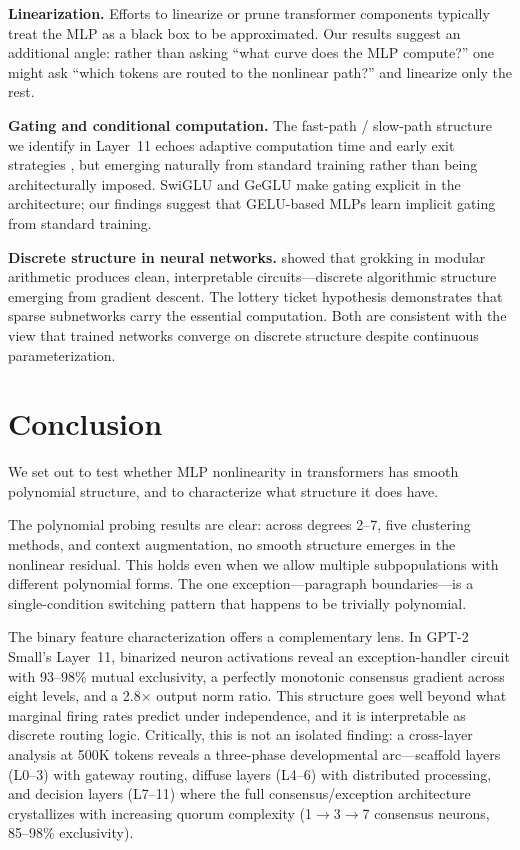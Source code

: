\documentclass{article}
\begin{document}
\textbf{Linearization.}
Efforts to linearize or prune transformer components
\citep{sharma2024truth, men2024shortgpt}
typically treat the MLP as a black box to be approximated. Our results suggest an additional
angle: rather than asking ``what curve does the MLP compute?'' one might ask ``which tokens
are routed to the nonlinear path?'' and linearize only the rest.

\textbf{Gating and conditional computation.}
The fast-path / slow-path structure we identify in Layer~11 echoes adaptive computation time
\citep{graves2016adaptive} and early exit strategies \citep{elbayad2020depth}, but emerging
naturally from standard training rather than being architecturally imposed.
SwiGLU and GeGLU \citep{shazeer2020glu} make gating explicit in the architecture;
our findings suggest that GELU-based MLPs learn implicit gating from standard training.

\textbf{Discrete structure in neural networks.}
\citet{nanda2023grokking} showed that grokking in modular arithmetic produces clean,
interpretable circuits---discrete algorithmic structure emerging from gradient descent.
The lottery ticket hypothesis \citep{frankle2019lottery} demonstrates that sparse subnetworks
carry the essential computation. Both are consistent with the view that trained networks
converge on discrete structure despite continuous parameterization.

\section{Conclusion}

We set out to test whether MLP nonlinearity in transformers has smooth polynomial structure,
and to characterize what structure it does have.

The polynomial probing results are clear: across degrees 2--7, five clustering methods, and
context augmentation, no smooth structure emerges in the nonlinear residual. This holds even
when we allow multiple subpopulations with different polynomial forms. The one
exception---paragraph boundaries---is a single-condition switching pattern that happens to be
trivially polynomial.

The binary feature characterization offers a complementary lens. In GPT-2 Small's Layer~11,
binarized neuron activations reveal an exception-handler circuit with 93--98\% mutual
exclusivity, a perfectly monotonic consensus gradient across eight levels, and a 2.8$\times$
output norm ratio. This structure goes well beyond what marginal firing rates predict under
independence, and it is interpretable as discrete routing logic. Critically, this is not an isolated finding: a cross-layer analysis at 500K tokens reveals
a three-phase developmental arc---scaffold layers (L0--3) with gateway routing, diffuse
layers (L4--6) with distributed processing, and decision layers (L7--11) where the full
consensus/exception architecture crystallizes with increasing quorum complexity
(1$\to$3$\to$7 consensus neurons, 85--98\% exclusivity).
\end{document}
